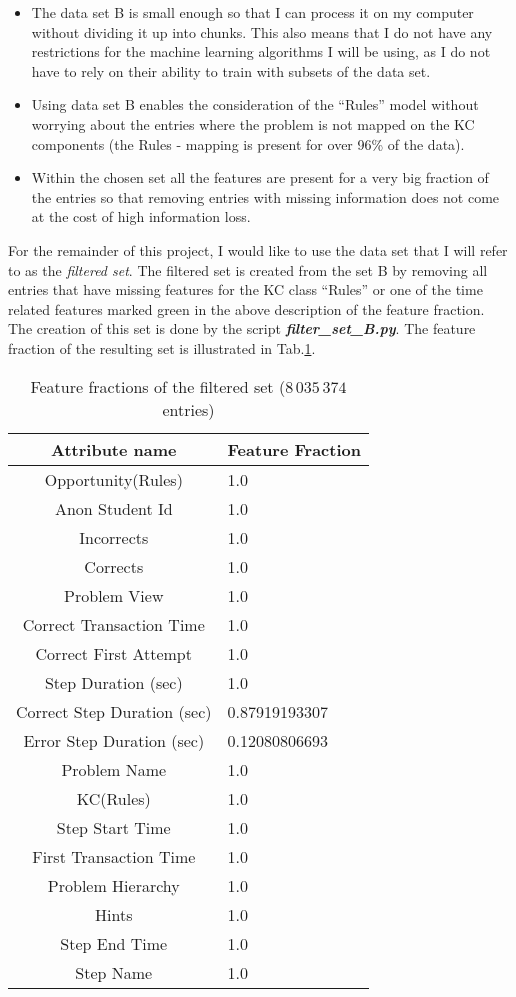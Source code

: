 \begin{itemize}
	\item The data set B is small enough so that I can process it on my computer without dividing it up into chunks. This also means that I do not have any restrictions for the machine learning algorithms I will be using, as I do not have to rely on their ability to train with subsets of the data set.
	\item Using data set B enables the consideration of the “Rules” model without worrying about the entries where the problem is not mapped on the KC components (the Rules - mapping is present for over 96\% of the data).
	\item Within the chosen set all the features are present for a very big fraction of the entries so that removing entries with missing information does not come at the cost of high information loss.	
\end{itemize}

For the remainder of this project, I would like to use the data set that I will refer to as the \emph{filtered set}. The filtered set is created from the set B by removing all entries that have missing features for the KC class “Rules” or one of the time related features marked green in the above description of the feature fraction. The creation of this set is done by the script \textbf{\emph{filter\_set\_B.py}}. The feature fraction of the resulting set is illustrated in Tab.\ref{tab_ff_filtered_set}.

\begin{table}[b]
	\centering
	\caption{Feature fractions of the filtered set ($8\,035\,374$ entries)\label{tab_ff_filtered_set}}
	\begin{tabular}{cl}
		\toprule
		Attribute name & Feature Fraction \\		
		\midrule
		Opportunity(Rules) &1.0\\ 
		Anon Student Id & 1.0\\ 
		Incorrects & 1.0 \\
		Corrects & 1.0\\ 
		Problem View & 1.0\\ 
		Correct Transaction Time & 1.0\\ 
		Correct First Attempt & 1.0 \\
		Step Duration (sec) & 1.0\\ 
		Correct Step Duration (sec) & 0.87919193307\\ 
		Error Step Duration (sec) & 0.12080806693 \\
		Problem Name & 1.0\\ 
		KC(Rules) & 1.0 \\
		Step Start Time & 1.0\\  
		First Transaction Time & 1.0\\ 
		Problem Hierarchy & 1.0 \\
		Hints & 1.0\\ 
		Step End Time & 1.0\\ 
		Step Name & 1.0\\
		\bottomrule
	\end{tabular}
\end{table}

 


